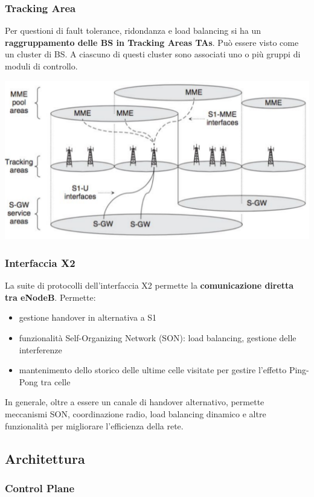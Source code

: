 \subsubsection{Tracking Area}

Per questioni di fault tolerance, ridondanza e load balancing si ha un \textbf{raggruppamento delle BS in Tracking Areas TAs}. Può essere visto come un cluster di BS. A ciascuno di questi cluster sono associati uno o più gruppi di moduli di controllo.
\begin{center}
	\includegraphics[width=0.7\linewidth]{img/4g/tas}
\end{center}

\subsubsection{Interfaccia X2}

La suite di protocolli dell'interfaccia X2 permette la \textbf{comunicazione diretta tra eNodeB}. Permette: 
\begin{itemize}
	\item gestione handover in alternativa a S1

	\item funzionalità Self-Organizing Network (SON): load balancing, gestione delle interferenze

	\item mantenimento dello storico delle ultime celle visitate per gestire l'effetto Ping-Pong tra celle
\end{itemize}

In generale, oltre a essere un canale di handover alternativo, permette meccanismi SON, coordinazione radio, load balancing dinamico e altre funzionalità per migliorare l'efficienza della rete.

\subsection{Architettura}

\subsubsection{Control Plane}


